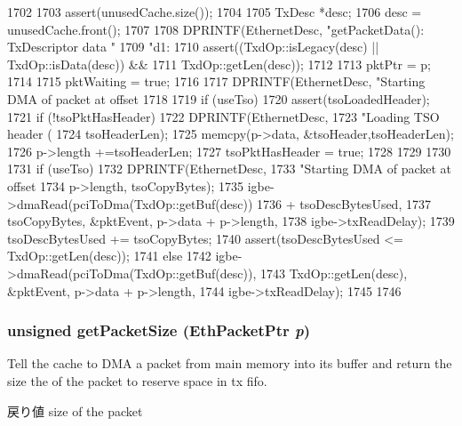 \begin{DoxyCode}
1702 {
1703     assert(unusedCache.size());
1704 
1705     TxDesc *desc;
1706     desc = unusedCache.front();
1707 
1708     DPRINTF(EthernetDesc, "getPacketData(): TxDescriptor data "
1709             "d1: %
1710     assert((TxdOp::isLegacy(desc) || TxdOp::isData(desc)) &&
1711            TxdOp::getLen(desc));
1712 
1713     pktPtr = p;
1714 
1715     pktWaiting = true;
1716 
1717     DPRINTF(EthernetDesc, "Starting DMA of packet at offset %
1718     
1719     if (useTso) {
1720         assert(tsoLoadedHeader);
1721         if (!tsoPktHasHeader) {
1722             DPRINTF(EthernetDesc,
1723                     "Loading TSO header (%
1724                     tsoHeaderLen);
1725             memcpy(p->data, &tsoHeader,tsoHeaderLen);
1726             p->length +=tsoHeaderLen;
1727             tsoPktHasHeader = true;
1728         }
1729     }
1730   
1731     if (useTso) {
1732         DPRINTF(EthernetDesc,
1733                 "Starting DMA of packet at offset %
1734                 p->length, tsoCopyBytes);
1735         igbe->dmaRead(pciToDma(TxdOp::getBuf(desc))
1736                       + tsoDescBytesUsed,
1737                       tsoCopyBytes, &pktEvent, p->data + p->length,
1738                       igbe->txReadDelay);
1739         tsoDescBytesUsed += tsoCopyBytes;
1740         assert(tsoDescBytesUsed <= TxdOp::getLen(desc));
1741     } else {
1742         igbe->dmaRead(pciToDma(TxdOp::getBuf(desc)),
1743                       TxdOp::getLen(desc), &pktEvent, p->data + p->length,
1744                       igbe->txReadDelay);
1745     }
1746 }
\end{DoxyCode}
\hypertarget{classIGbE_1_1TxDescCache_a924187a1c689184efd8492916ca12e32}{
\subsubsection[{getPacketSize}]{\setlength{\rightskip}{0pt plus 5cm}unsigned getPacketSize ({\bf EthPacketPtr} {\em p})}}
\label{classIGbE_1_1TxDescCache_a924187a1c689184efd8492916ca12e32}
Tell the cache to DMA a packet from main memory into its buffer and return the size the of the packet to reserve space in tx fifo. \begin{DoxyReturn}{戻り値}
size of the packet 
\end{DoxyReturn}



